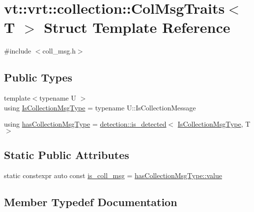 \hypertarget{structvt_1_1vrt_1_1collection_1_1_col_msg_traits}{}\section{vt\+:\+:vrt\+:\+:collection\+:\+:Col\+Msg\+Traits$<$ T $>$ Struct Template Reference}
\label{structvt_1_1vrt_1_1collection_1_1_col_msg_traits}


{\ttfamily \#include $<$coll\+\_\+msg.\+h$>$}

\subsection*{Public Types}
\begin{DoxyCompactItemize}
\item 
{\footnotesize template$<$typename U $>$ }\\using \hyperlink{structvt_1_1vrt_1_1collection_1_1_col_msg_traits_ace04bfcf053b51736d5aec0d28b5274b}{Is\+Collection\+Msg\+Type} = typename U\+::\+Is\+Collection\+Message
\item 
using \hyperlink{structvt_1_1vrt_1_1collection_1_1_col_msg_traits_aa181d98e798e8846ceb8f1c8b8204a7e}{has\+Collection\+Msg\+Type} = \hyperlink{namespacedetection_a30893549a3de1e9603d78dad6d5dce92}{detection\+::is\+\_\+detected}$<$ \hyperlink{structvt_1_1vrt_1_1collection_1_1_col_msg_traits_ace04bfcf053b51736d5aec0d28b5274b}{Is\+Collection\+Msg\+Type}, T $>$
\end{DoxyCompactItemize}
\subsection*{Static Public Attributes}
\begin{DoxyCompactItemize}
\item 
static constexpr auto const \hyperlink{structvt_1_1vrt_1_1collection_1_1_col_msg_traits_a8eb18b4bd6ca875aa981c1998a69896d}{is\+\_\+coll\+\_\+msg} = \hyperlink{structdetection_1_1detector_a6d7d0e1bdf5903db9edbe448edccf83b}{has\+Collection\+Msg\+Type\+::value}
\end{DoxyCompactItemize}


\subsection{Member Typedef Documentation}
\mbox{\label{structvt_1_1vrt_1_1collection_1_1_col_msg_traits_aa181d98e798e8846ceb8f1c8b8204a7e}} 
